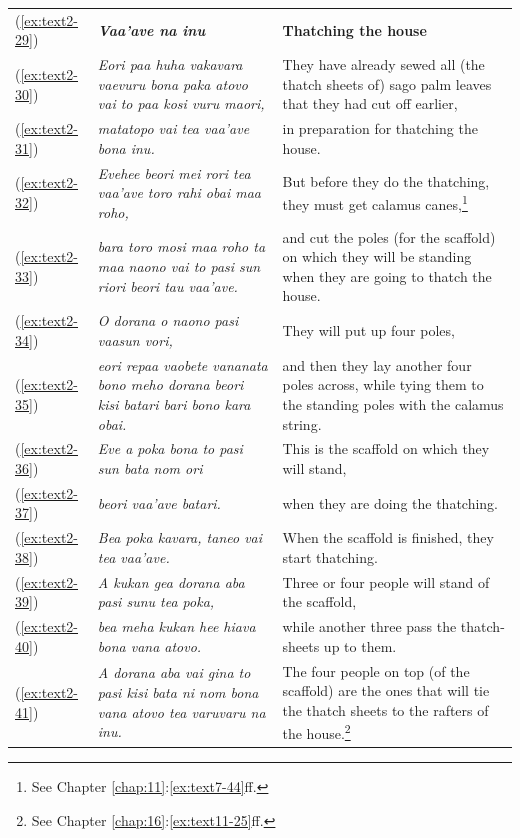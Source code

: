 \documentclass[output=paper]{langscibook}
\begin{document}
\begin{xltabular}{\textwidth}{lXX}
    (\ref{ex:text2-29})&\textit{\textbf{Vaa'ave na inu}}&\textbf{Thatching the house}\\
    (\ref{ex:text2-30})&\textit{Eori paa huha vakavara vaevuru bona paka atovo vai to paa kosi vuru maori,}&They have already sewed all (the thatch sheets of) sago palm leaves that they had cut off earlier,\\
    (\ref{ex:text2-31})&\textit{matatopo vai tea vaa'ave bona inu.}&in preparation for thatching the house.\\
    (\ref{ex:text2-32})&\textit{Evehee beori mei rori tea vaa'ave toro rahi obai maa roho,}&But before they do the thatching, they must get calamus canes,\footnote{See Chapter \ref{chap:11}:\ref{ex:text7-44}ff.}\\
    (\ref{ex:text2-33})&\textit{bara toro mosi maa roho ta maa naono vai to pasi sun riori beori tau vaa'ave.}&and cut the poles (for the scaffold) on which they will be standing when they are going to thatch the house.\\
    (\ref{ex:text2-34})&\textit{O dorana o naono pasi vaasun vori,}&They will put up four poles,\\
    (\ref{ex:text2-35})&\textit{eori repaa vaobete vananata bono meho dorana beori kisi batari bari bono kara obai.}&and then they lay another four poles across, while tying them to the standing poles with the calamus string.\\
    (\ref{ex:text2-36})&\textit{Eve a poka bona to pasi sun bata nom ori}&This is the scaffold on which they will stand,\\
    (\ref{ex:text2-37})&\textit{beori vaa'ave batari.}&when they are doing the thatching.\\
    (\ref{ex:text2-38})&\textit{Bea poka kavara, taneo vai tea vaa'ave.}&When the scaffold is finished, they start thatching.\\
    (\ref{ex:text2-39})&\textit{A kukan gea dorana aba pasi sunu tea poka,}&Three or four people will stand of the scaffold,\\
    (\ref{ex:text2-40})&\textit{bea meha kukan hee hiava bona vana atovo.}&while another three pass the thatch-sheets up to them.\\
    (\ref{ex:text2-41})&\textit{A dorana aba vai gina to pasi kisi bata ni nom bona vana atovo tea varuvaru na inu.}&The four people on top (of the scaffold) are the ones that will tie the thatch sheets to the rafters of the house.\footnote{See Chapter \ref{chap:16}:\ref{ex:text11-25}ff.}\\
\end{xltabular}
\end{document}
